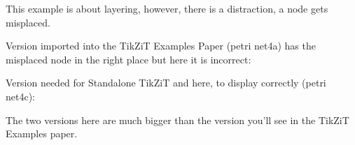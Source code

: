 \documentclass{article}
\begin{document}
This example is about layering, however, there is a distraction, a node gets misplaced.  

Version imported into the TikZiT Examples Paper (petri net4a) has the misplaced node in the right place but here it is incorrect:

Version needed for Standalone TikZiT and here, to display correctly (petri net4c):


The two versions here are much bigger than the version you'll see in the TikZiT Examples paper.
\end{document}
